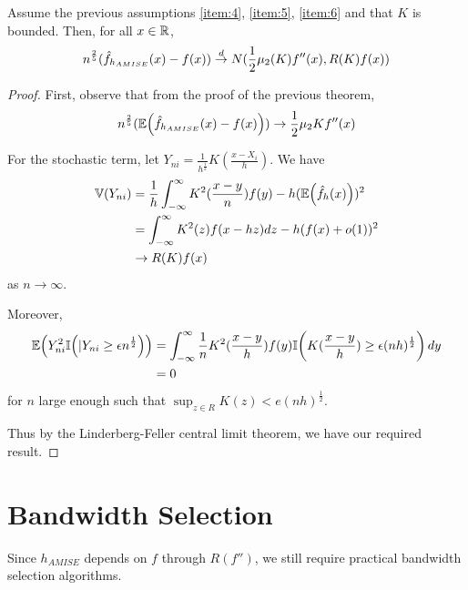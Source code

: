 \begin{thm}
  \label{defn:Introduction:4}
  Assume the previous assumptions \ref{item:4}, \ref{item:5},
  \ref{item:6} and that $K$ is bounded.  Then, for all $x \in \mathbb{R}$,
  \begin{equation}
    \label{eq:26}
    n^{\frac{2}{5}}(\hat f_{h_{AMISE}}(x) - f(x)) \overset{d}{\rightarrow}
    N(\frac{1}{2}\mu_{2}(K) f''(x), R(K) f(x))
  \end{equation}
\end{thm}

\begin{proof}
  First, observe that from the proof of the previous theorem,
  \begin{align}
    \label{eq:27}
    n^{\frac{2}{5}} (\E{\hat f_{h_{AMISE}}(x) - f(x)}) \rightarrow
    \frac{1}{2} \mu_{2} K f''(x)
  \end{align}

  For the stochastic term, let $Y_{ni} = \frac{1}{h^{\frac{1}{2}}}
  K(\frac{x - X_{i}}{h})$.  We have
  \begin{align}
    \label{eq:28}
    \Var{Y_{ni}} &= \frac{1}{h} \int_{-\infty}^{\infty}
    K^{2}(\frac{x-y}{n}) f(y) - h(\E{\hat f_{h}(x)})^{2} \\
    &= \int_{-\infty}^{\infty} K^{2}(z) f(x - hz) dz - h(f(x) +
    o(1))^{2} \\
    &\rightarrow R(K) f(x)
  \end{align} as $n \rightarrow \infty$.

  Moreover,
  \begin{align}
    \label{eq:29}
    \E{Y^{2}_{ni} \I{|Y_{ni} \geq \epsilon n^{\frac{1}{2}}}} &=
    \int_{-\infty}^{\infty} \frac{1}{n} K^{2}(\frac{x - y}{h}) f(y)
    \I{K(\frac{x - y}{h}) \geq \epsilon (nh)^{\frac{1}{2}}} dy \\
    &= 0
  \end{align} for $n$ large enough such that $\sup_{z \in R} K(z) < e
  (nh)^\frac{1}{2}$.

  Thus by the Linderberg-Feller central limit theorem, we have our
  required result.
\end{proof}

\section{Bandwidth Selection}
\label{sec:bandwidth-selection}

Since $h_{AMISE}$ depends on $f$ through $R(f'')$, we still require
practical bandwidth selection algorithms.

